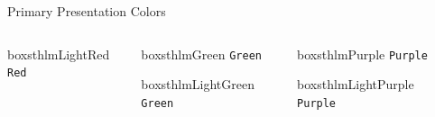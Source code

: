 \documentclass[newPxFont,numfooter,sectionpages]{beamer}
\begin{document}
\begin{frame}[c]{Primary Presentation Colors}
\begin{columns}[c]
\begin{column}{0.12\textwidth}
\vspace{3em}

\begin{beamercolorbox}[wd=\linewidth,ht=5ex,dp=3ex]{boxsthlmLightRed}
\centering
	\texttt{Red}
\end{beamercolorbox}
\end{column}

\begin{column}{0.12\textwidth}

\vspace{3em}

\begin{beamercolorbox}[wd=\linewidth,ht=5ex,dp=3ex]{boxsthlmGreen}
\centering
	\texttt{Green}
\end{beamercolorbox}

\vspace{3em}

\begin{beamercolorbox}[wd=\linewidth,ht=5ex,dp=3ex]{boxsthlmLightGreen}
\centering
	\texttt{Green}
\end{beamercolorbox}
\end{column}

\begin{column}{0.12\textwidth}

\vspace{3em}

\begin{beamercolorbox}[wd=\linewidth,ht=5ex,dp=3ex]{boxsthlmPurple}
\centering
	\texttt{Purple}
\end{beamercolorbox}

\vspace{3em}

\begin{beamercolorbox}[wd=\linewidth,ht=5ex,dp=3ex]{boxsthlmLightPurple}
\centering
	\texttt{Purple}
\end{beamercolorbox}
\end{column}

\begin{column}{0.12\textwidth}

\vspace{3em}


\end{column}
\end{columns}
\end{frame}
\end{document}
